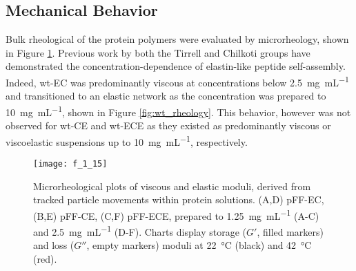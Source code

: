 \begin{refsection}
\subsection{Mechanical Behavior}

Bulk rheological of the protein polymers were evaluated by microrheology, shown
in Figure \ref{fig:pFF_rheology}. Previous work by both the Tirrell and Chilkoti
groups have demonstrated the concentration-dependence of elastin-like peptide
self-assembly.\cite{Meyer2004,Yamaoka2003} Indeed, wt-EC was predominantly
viscous at concentrations below \SI{2.5}{\mg\per\mL} and transitioned to an
elastic network as the concentration was prepared to \SI{10}{\mg\per\mL}, shown
in Figure \ref{fig:wt_rheology}.\cite{Haghpanah2010} This behavior, however was
not observed for wt-CE and wt-ECE as they existed as predominantly viscous or
viscoelastic suspensions up to \SI{10}{\mg\per\mL}, respectively.
\begin{figure}[h!] \centering \texttt{[image: f\_1\_15]}
    \caption{Microrheological plots of viscous and elastic moduli, derived from
    tracked particle movements within protein solutions. (A,D) pFF-EC, (B,E)
    pFF-CE, (C,F) pFF-ECE, prepared to \SI{1.25}{\mg\per\mL} (A-C) and
    \SI{2.5}{\mg\per\mL} (D-F). Charts display storage (${G'}$, filled markers) and loss
    (${G''}$, empty markers) moduli at \SI{22}{\celsius} (black) and \SI{42}{\celsius}
(red).} \label{fig:pFF_rheology} \end{figure}


\end{refsection}
